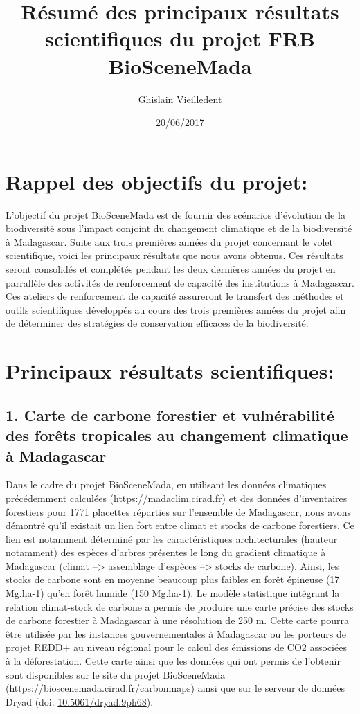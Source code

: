 \documentclass[]{article}
\title{Résumé des principaux résultats scientifiques du projet FRB BioSceneMada}
\author{Ghislain Vieilledent}
\date{20/06/2017}
\begin{document}
\maketitle

\section{Rappel des objectifs du
projet:}\label{rappel-des-objectifs-du-projet}

L'objectif du projet BioSceneMada est de fournir des scénarios
d'évolution de la biodiversité sous l'impact conjoint du changement
climatique et de la biodiversité à Madagascar. Suite aux trois premières
années du projet concernant le volet scientifique, voici les principaux
résultats que nous avons obtenus. Ces résultats seront consolidés et
complétés pendant les deux dernières années du projet en parrallèle des
activités de renforcement de capacité des institutions à Madagascar. Ces
ateliers de renforcement de capacité assureront le transfert des
méthodes et outils scientifiques développés au cours des trois premières
années du projet afin de déterminer des stratégies de conservation
efficaces de la biodiversité.

\section{Principaux résultats
scientifiques:}\label{principaux-resultats-scientifiques}

\subsection{1. Carte de carbone forestier et vulnérabilité des forêts
tropicales au changement climatique à
Madagascar}\label{carte-de-carbone-forestier-et-vulnerabilite-des-forets-tropicales-au-changement-climatique-a-madagascar}

Dans le cadre du projet BioSceneMada, en utilisant les données
climatiques précédemment calculées (\url{https://madaclim.cirad.fr}) et
des données d'inventaires forestiers pour 1771 placettes réparties sur
l'ensemble de Madagascar, nous avons démontré qu'il existait un lien
fort entre climat et stocks de carbone forestiers. Ce lien est notamment
déterminé par les caractéristiques architecturales (hauteur notamment)
des espèces d'arbres présentes le long du gradient climatique à
Madagascar (climat --\textgreater{} assemblage d'espèces
--\textgreater{} stocks de carbone). Ainsi, les stocks de carbone sont
en moyenne beaucoup plus faibles en forêt épineuse (17 Mg.ha-1) qu'en
forêt humide (150 Mg.ha-1). Le modèle statistique intégrant la relation
climat-stock de carbone a permis de produire une carte précise des
stocks de carbone forestier à Madagascar à une résolution de 250 m.
Cette carte pourra être utilisée par les instances gouvernementales à
Madagascar ou les porteurs de projet REDD+ au niveau régional pour le
calcul des émissions de CO2 associées à la déforestation. Cette carte
ainsi que les données qui ont permis de l'obtenir sont disponibles sur
le site du projet BioSceneMada
(\url{https://bioscenemada.cirad.fr/carbonmaps}) ainsi que sur le
serveur de données Dryad (doi:
\href{http://doi.org/10.5061/dryad.9ph68}{10.5061/dryad.9ph68}).
\end{document}
